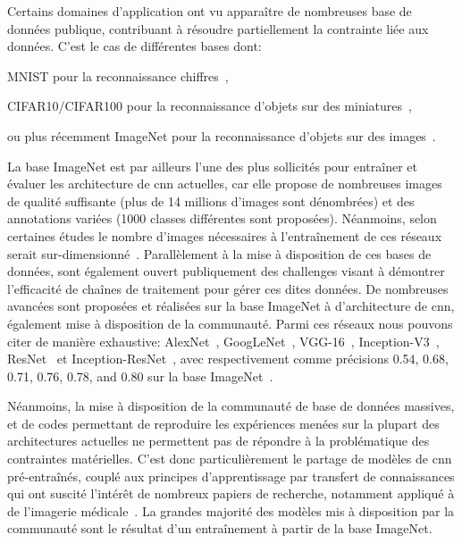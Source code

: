 Certains domaines d'application ont vu apparaître de nombreuses base de données publique, contribuant à résoudre partiellement la contrainte liée aux données. C'est le cas de différentes bases dont: 
\begin{inlinerate}
    \item MNIST pour la reconnaissance chiffres~\cite{lecun2010},
    \item CIFAR10/CIFAR100 pour la reconnaissance d'objets sur des miniatures~\cite{Krizhevsky}, 
    \item ou plus récemment ImageNet pour la reconnaissance d'objets sur des images~\cite{Deng2008}. 
\end{inlinerate}
La base ImageNet est par ailleurs l'une des plus sollicités pour entraîner et évaluer les architecture de \gls{cnn} actuelles, car elle propose de nombreuses images de qualité suffisante (plus de 14 millions d'images sont dénombrées) et des annotations variées (1000 classes différentes sont proposées). Néanmoins, selon certaines études le nombre d'images nécessaires à l'entraînement de ces réseaux serait sur-dimensionné~\cite{huh2016}. Parallèlement à la mise à disposition de ces bases de données, sont également ouvert publiquement des challenges visant à démontrer l'efficacité de chaînes de traitement pour gérer ces dites données. De nombreuses avancées sont proposées et réalisées sur la base ImageNet à d'architecture de \gls{cnn}, également mise à disposition de la communauté. Parmi ces réseaux nous pouvons citer de manière exhaustive: AlexNet~\cite{Krizhevsky2012}, GoogLeNet~\cite{Szegedy2015}, VGG-16~\cite{Simonyan2014}, Inception-V3~\cite{Szegedy2016}, ResNet~\cite{He2016} et Inception-ResNet~\cite{Szegedy2017}, avec respectivement comme précisions 0.54, 0.68, 0.71, 0.76, 0.78, and 0.80 sur la base ImageNet~\cite{Canziani2016}.\par

Néanmoins, la mise à disposition de la communauté de base de données massives, et de codes permettant de reproduire les expériences menées sur la plupart des architectures actuelles ne permettent pas de répondre à la problématique des contraintes matérielles. C'est donc particulièrement le partage de modèles de \gls{cnn} pré-entraînés, couplé aux principes d'apprentissage par transfert de connaissances qui ont suscité l'intérêt de nombreux papiers de recherche, notamment appliqué à de l'imagerie médicale~\cite{Litjens2017}. La grandes majorité des modèles mis à disposition par la communauté sont le résultat d'un entraînement à partir de la base ImageNet.\par
 
